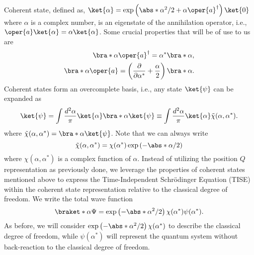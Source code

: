 Coherent state, defined as, \(\ket{\alpha} = \exp\left(\abs*{\alpha}^2/2 + \alpha \oper{a}^\dagger\right) \ket{0}\)
where \(\alpha\) is a complex number, is an eigenstate of the annihilation operator, i.e., 
\(\oper{a}\ket{\alpha} = \alpha \ket{\alpha}\). Some crucial properties that will be of use to us are 
\begin{equation}
    \label{eq:class_jcm_eq19}
    \begin{aligned}
        \bra*{\alpha}\oper{a}^\dagger = \alpha^* \bra*{\alpha},\\
        \bra*{\alpha}\oper{a} = \left(\dfrac{\partial}{\partial \alpha^*} + \frac{\alpha}{2}\right)\bra*{\alpha}.
    \end{aligned}
\end{equation}
Coherent states form an overcomplete basis, i.e., any state \(\ket{\psi}\) can be expanded as
\begin{equation}
    \label{eq:class_jcm_eq20}
    \ket{\psi} = \int \frac{d^2\alpha}{\pi} \ket{\alpha}\bra*{\alpha}\ket{\psi} \equiv 
    \int \frac{d^2\alpha}{\pi} \ket{\alpha}\Tilde{\chi}(\alpha, \alpha^*).
\end{equation}
where \(\Tilde{\chi}(\alpha, \alpha^*) = \bra*{\alpha}\ket{\psi}\). Note that we can 
always write  
\[\Tilde{\chi}(\alpha, \alpha^*) = \chi(\alpha^*)\exp\left(-\abs*{\alpha}/2\right)\]
where \(\chi(\alpha, \alpha^*)\) is a complex function of \(\alpha\). Instead of utilizing the position
$Q$ representation as previously done, we leverage the properties of coherent states mentioned 
above to express the Time-Independent Schrödinger Equation (TISE) within the coherent state 
representation relative to the classical degree of freedom. We write the total wave function
\begin{equation}
    \label{eq:class_jcm_eq21}
    \braket*{\alpha}{\Psi} = \exp\left(-\abs*{\alpha}^2/2\right)\chi(\alpha^*)\psi(\alpha^*).
\end{equation}
As before, we will consider \( \exp\left(-\abs*{\alpha}^2/2\right)\chi(\alpha^*)\) to 
describe the classical degree of freedom, while \(\psi(\alpha^*)\) will represent the 
quantum system without back-reaction to the classical degree of freedom.

